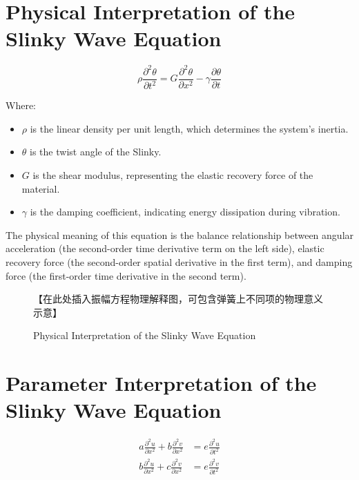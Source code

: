 \documentclass{mcmthesis}  %
\begin{document}
\printbibliography  %


\begin{appendices}  %

\section{Physical Interpretation of the Slinky Wave Equation}  %

\begin{equation}
\rho\frac{\partial^2 \theta}{\partial t^2} = G\frac{\partial^2 \theta}{\partial x^2} - \gamma \frac{\partial \theta}{\partial t}
\end{equation}

Where:
\begin{itemize}
    \item $\rho$ is the linear density per unit length, which determines the system's inertia.
    \item $\theta$ is the twist angle of the Slinky.
    \item $G$ is the shear modulus, representing the elastic recovery force of the material.
    \item $\gamma$ is the damping coefficient, indicating energy dissipation during vibration.
\end{itemize}

The physical meaning of this equation is the balance relationship between angular acceleration (the second-order time derivative term on the left side), elastic recovery force (the second-order spatial derivative in the first term), and damping force (the first-order time derivative in the second term).

\begin{figure}[h!]
    \centering
    【在此处插入振幅方程物理解释图，可包含弹簧上不同项的物理意义示意】
    \caption{Physical Interpretation of the Slinky Wave Equation}
    \label{fig:wave_equation_interpretation}
\end{figure}

\section{Parameter Interpretation of the Slinky Wave Equation}  %

\begin{align}
a\frac{\partial^2 u}{\partial x^2} + b\frac{\partial^2 v}{\partial x^2} &= e\frac{\partial^2 u}{\partial t^2} \\
b\frac{\partial^2 u}{\partial x^2} + c\frac{\partial^2 v}{\partial x^2} &= e\frac{\partial^2 v}{\partial t^2}
\end{align}


\end{appendices}
\end{document}
